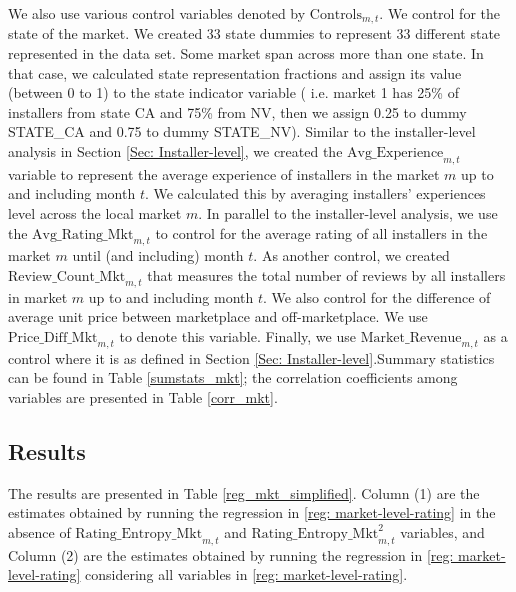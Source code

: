 \documentclass[msom,blindrev]{informs3}
\begin{document}
We also use various control variables denoted by $\text{Controls}_{m,t}$. We control for the state of the market. We created 33 state dummies to represent 33 different state represented in the data set. Some market span across more than one state. In that case, we calculated state representation fractions and assign its value (between 0 to 1) to the state indicator variable ( i.e.  market 1 has 25\% of installers from state CA and 75\% from NV, then we assign 0.25 to dummy STATE\_CA and 0.75 to dummy STATE\_NV). Similar to the installer-level analysis in Section \ref{Sec: Installer-level}, we created the $\text{Avg\_Experience}_{m,t}$ variable to represent the average experience of installers in the market $m$ up to and including month $t$. We calculated this by averaging installers' experiences level across the local market $m$. In parallel to the installer-level analysis, we use the $\text{Avg\_Rating\_Mkt}_{m,t}$ to control for the average rating of all installers in the market $m$ until (and including) month $t$. As another control, we created $\text{Review\_Count\_Mkt}_{m,t}$ that measures the total number of reviews by all installers in market $m$ up to and including month $t$. We also control for the difference of average unit price between marketplace and off-marketplace. We use $\text{Price\_Diff\_Mkt}_{m,t}$ to denote this variable. Finally, we use $\text{Market\_Revenue}_{m,t}$ as a control where it is as defined in Section \ref{Sec: Installer-level}.Summary statistics can be found in Table \ref{sumstats_mkt}; the correlation coefficients among variables are presented in Table \ref{corr_mkt}.

\subsection{Results}


The results are presented in Table \ref{reg_mkt_simplified}. Column (1) are the estimates obtained by running the regression in \eqref{reg: market-level-rating} in the absence of $\text{Rating\_Entropy\_Mkt}_{m,t}$ and $\text{Rating\_Entropy\_Mkt}^2_{m,t}$ variables, and  Column (2) are the estimates obtained by running the regression in \eqref{reg: market-level-rating} considering all variables in \eqref{reg: market-level-rating}.



\end{document}
